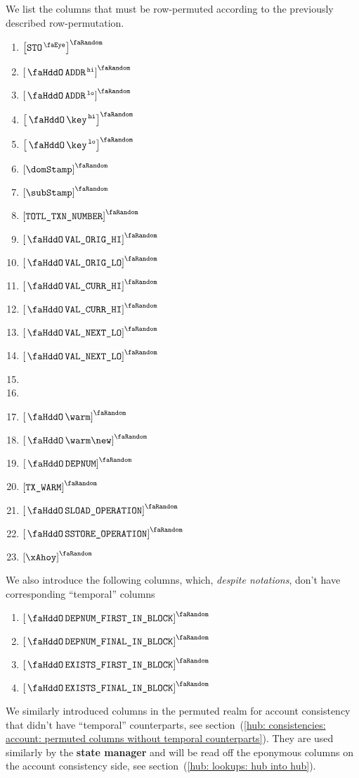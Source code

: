 We list the columns that must be row-permuted according to the previously described row-permutation.
\begin{multicols}{3}
	\begin{enumerate}
		\item $\order{\peekStorage}$
		\item $\order{\stoAddressHi}$
		\item $\order{\stoAddressLo}$
		\item $\order{\stoKeyHi}$
		\item $\order{\stoKeyLo}$
		\item $\order{\domStamp}$
		\item $\order{\subStamp}$
		\item $\order{\totalTransactionNumber}$
		\item $\order{\stoOrigValueHi}$
		\item $\order{\stoOrigValueLo}$
		\item $\order{\stoCurrValueHi}$
		\item $\order{\stoCurrValueHi}$
		\item $\order{\stoNextValueLo}$
		\item $\order{\stoNextValueLo}$
		\item[\vspace{\fill}]
		\item[\vspace{\fill}]
		\item $\order{\stoWarmth}$
		\item $\order{\stoWarmth\new}$
		\item $\order{\stoDeploymentNumber}$
		\item $\order{\txWarm}$
		\item $\order{\stoSloadOperation}$
		\item $\order{\stoSstoreOperation}$
		\item $\order{\xAhoy}$
	\end{enumerate}
\end{multicols}
We also introduce the following columns, which, \emph{despite notations}, don't have corresponding ``temporal'' columns
\begin{enumerate}
	\item $\order{\stoDeploymentNumberFirstInBlock}$
	\item $\order{\stoDeploymentNumberFinalInBlock}$
	\item $\order{\stoExistenceFirstInBlock}$
	\item $\order{\stoExistenceFinalInBlock}$
\end{enumerate}
\saNote{}
We similarly introduced columns in the permuted realm for account consistency that didn't have ``temporal'' counterparts,
see section~(\ref{hub: consistencies: account: permuted columns without temporal counterparts}).
They are used similarly by the \textbf{state manager} and will be read off the eponymous columns on the account consistency side,
see section~(\ref{hub: lookups: hub into hub}).

